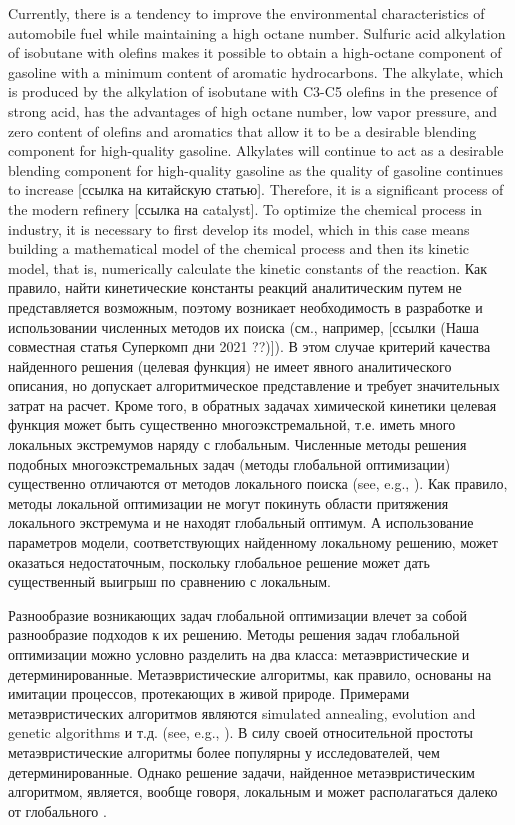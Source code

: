\documentclass{svproc}
\begin{document}
Currently, there is a tendency to improve the environmental characteristics of automobile fuel while maintaining a high octane number. Sulfuric acid alkylation of isobutane with olefins makes it possible to obtain a high-octane component of gasoline with a minimum content of aromatic hydrocarbons. The alkylate, which is produced by the alkylation of isobutane with C3-C5 olefins in the presence of strong acid, has the advantages of high octane number, low vapor pressure, and zero content of olefins and aromatics that allow it to be a desirable blending component for high-quality gasoline. Alkylates will continue to act as a desirable blending component for high-quality gasoline as the quality of gasoline continues to increase [ссылка на китайскую статью]. Therefore, it is a significant process of the modern refinery [ссылка на catalyst]. To optimize the chemical process in industry, it is necessary to first develop its model, which in this case means building a mathematical model of the chemical process and then its kinetic model, that is, numerically calculate the kinetic constants of the reaction. 
Как правило, найти кинетические константы реакций аналитическим путем не представляется возможным, поэтому возникает необходимость в разработке и использовании численных методов их поиска (см., например, [ссылки (Наша совместная статья Суперкомп дни 2021 ??)]). В этом случае критерий качества найденного решения (целевая функция) не имеет явного аналитического описания, но допускает алгоритмическое представление и требует значительных затрат на расчет. Кроме того, в обратных задачах химической кинетики целевая функция может быть существенно многоэкстремальной, т.е. иметь много локальных экстремумов наряду с глобальным. 
Численные методы решения подобных многоэкстремальных задач (методы глобальной оптимизации) существенно отличаются от методов локального поиска (see, e.g., \cite{Sergeyev2017,PaulaviciusZilinskas2014}). Как правило, методы локальной оптимизации не могут покинуть области притяжения локального экстремума и не находят глобальный оптимум. А использование параметров модели, соответствующих найденному локальному решению, может оказаться недостаточным, поскольку глобальное решение может дать существенный выигрыш по сравнению с локальным. 

Разнообразие возникающих задач глобальной оптимизации влечет за собой разнообразие подходов к их решению.
Методы решения задач глобальной оптимизации можно условно разделить на два класса: метаэвристические и детерминированные. Метаэвристические алгоритмы, как правило, основаны на имитации процессов, протекающих в живой природе.
Примерами метаэвристических алгоритмов являются simulated annealing, evolution and genetic algorithms и т.д. (see, e.g., \cite{Battiti2009,Eiben2015}). В силу своей относительной простоты метаэвристические алгоритмы более популярны у исследователей, чем детерминированные.  Однако решение задачи, найденное метаэвристическим алгоритмом, является, вообще говоря, локальным и может располагаться далеко от глобального \cite{Kvasov2018}. 
\end{document}
